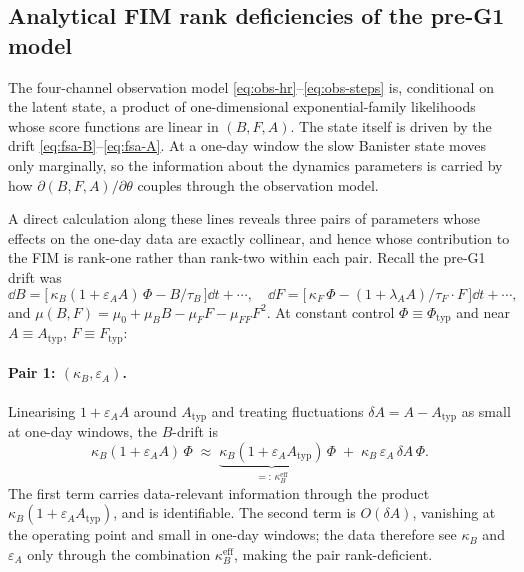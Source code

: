 \subsection{Analytical FIM rank deficiencies of the pre-G1 model}

The four-channel observation model
\eqref{eq:obs-hr}--\eqref{eq:obs-steps} is, conditional on the latent
state, a product of one-dimensional exponential-family likelihoods
whose score functions are linear in $(B,F,A)$. The state itself is
driven by the drift \eqref{eq:fsa-B}--\eqref{eq:fsa-A}. At a one-day
window the slow Banister state moves only marginally, so the
information about the dynamics parameters is carried by how
$\partial(B,F,A)/\partial\theta$ couples through the observation model.

A direct calculation along these lines reveals three pairs of
parameters whose effects on the one-day data are exactly collinear, and
hence whose contribution to the FIM is rank-one rather than rank-two
within each pair. Recall the pre-G1 drift was
\begin{equation*}
  \dd B = \bigl[\,\kappa_B(1+\varepsilon_A A)\,\Phi - B/\tau_B\,\bigr]\dd t + \cdots,
  \quad
  \dd F = \bigl[\,\kappa_F\,\Phi - (1+\lambda_A A)/\tau_F \cdot F\,\bigr]\dd t + \cdots,
\end{equation*}
and $\mu(B,F) = \mu_0 + \mu_B B - \mu_F F - \mu_{FF} F^2$. At constant
control $\Phi \equiv \Phi_{\mathrm{typ}}$ and near
$A \equiv A_{\mathrm{typ}}$, $F \equiv F_{\mathrm{typ}}$:

\paragraph{Pair 1: $(\kappa_B,\varepsilon_A)$.} Linearising
$1+\varepsilon_A A$ around $A_{\mathrm{typ}}$ and treating fluctuations
$\delta A = A - A_{\mathrm{typ}}$ as small at one-day windows, the
$B$-drift is
\begin{equation}
  \kappa_B (1+\varepsilon_A A)\,\Phi
   \;\approx\;
   \underbrace{\kappa_B(1+\varepsilon_A A_{\mathrm{typ}})}_{=:\,\kappa_B^{\mathrm{eff}}}\,\Phi
   \;+\; \kappa_B\,\varepsilon_A\,\delta A\,\Phi.
  \label{eq:pair1-expand}
\end{equation}
The first term carries data-relevant information through the product
$\kappa_B(1+\varepsilon_A A_{\mathrm{typ}})$, and is identifiable. The
second term is $O(\delta A)$, vanishing at the operating point and
small in one-day windows; the data therefore see $\kappa_B$ and
$\varepsilon_A$ only through the combination $\kappa_B^{\mathrm{eff}}$,
making the pair rank-deficient.

